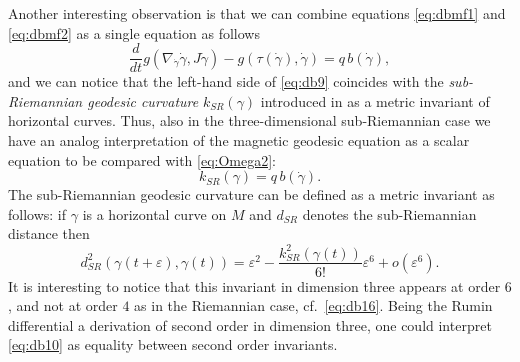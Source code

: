 \documentclass{amsart}
\theoremstyle{plain}
\theoremstyle{definition}
\theoremstyle{remark}
\newcommand{\eps}{\varepsilon}
\begin{document}
 Another interesting observation is that we can combine equations \eqref{eq:dbmf1} and \eqref{eq:dbmf2} as a single equation as follows
\begin{equation}\label{eq:db9}
\frac{d}{dt} g(\nabla_{\dot\gamma}\dot \gamma,J\dot \gamma)-g(\tau(\dot \gamma),\dot \gamma)=q\, b(\dot \gamma),
\end{equation}
and we can notice that the left-hand side of \eqref{eq:db9} coincides with the \emph{sub-Riemannian geodesic curvature} $k_{SR}(\gamma)$ introduced in \cite{BKACV} as a metric invariant of horizontal curves. Thus, also in the three-dimensional sub-Riemannian case we have an analog interpretation of the magnetic geodesic equation as a scalar equation to be compared with \eqref{eq:Omega2}:
\begin{equation}\label{eq:db10}
k_{SR}(\gamma)=q\,  b(\dot \gamma).
\end{equation}
The sub-Riemannian geodesic curvature can be defined as a metric invariant as follows: if $\gamma$ is a horizontal curve on $M$ and $d_{SR}$ denotes the sub-Riemannian  distance then \cite[Theorem~3]{BKACV} 
\begin{equation}\label{eq:db15}
d_{SR}^{2}(\gamma(t+\eps),\gamma(t))=\eps^{2}-\frac{k^{2}_{SR}(\gamma(t))}{6!}\eps^{6}+o(\eps^{6}).
\end{equation}
It is interesting to notice that this invariant in dimension three appears at order $6$, and not at order $4$ as in the Riemannian case, cf.\ \eqref{eq:db16}. 
Being the Rumin differential a derivation of second order in dimension three, one could interpret \eqref{eq:db10} as equality between second order invariants.
\end{document}
